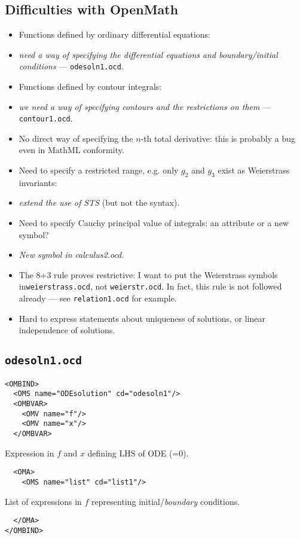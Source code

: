 \documentclass[11pt,a4paper]{artikel3}
\begin{document}
\subsection{Difficulties with OpenMath}
\begin{itemize}
\item Functions defined by ordinary differential equations:
\item[]{\it need a way of specifying the differential equations and
boundary/initial conditions\/}
--- {\tt odesoln1.ocd}.
\item Functions defined by contour integrals:
\item[]{\it we need a way of specifying contours and the restrictions on them\/}
--- {\tt contour1.ocd}.
\item No direct way of specifying the $n$-th total derivative: this is
probably a bug even in MathML conformity.
\item Need to specify a restricted range, e.g. only $g_2$ and $g_3$ exist as
Weierstrass invariants:
\item[]{\it extend the use of STS\/} (but not the syntax).
\item Need to specify Cauchy principal value of integrals: an attribute or
a new symbol?
\item[]{\it New symbol in\/} {\it calculus2.ocd}.
\item The 8+3 rule proves restrictive: I want to put the Weierstrass
symbols in\verb+weierstrass.ocd+, not \verb+weierstr.ocd+. In fact, this
rule is not followed already --- see \verb+relation1.ocd+ for example.
\item Hard to express statements about uniqueness of solutions, or linear
independence of solutions.
\end{itemize}
\subsection{{\tt odesoln1.ocd}}
\begin{verbatim}
<OMBIND>
  <OMS name="ODEsolution" cd="odesoln1"/>
  <OMBVAR>
    <OMV name="f"/>
    <OMV name="x"/>
  </OMBVAR>
\end{verbatim}
Expression in $f$ and $x$ defining LHS of ODE (=0).
\begin{verbatim}
  <OMA>
    <OMS name="list" cd="list1"/>
\end{verbatim}
List of expressions in $f$ representing initial/{\it boundary\/} conditions.
\begin{verbatim}
  </OMA>
</OMBIND>
\end{verbatim}
\end{document}
